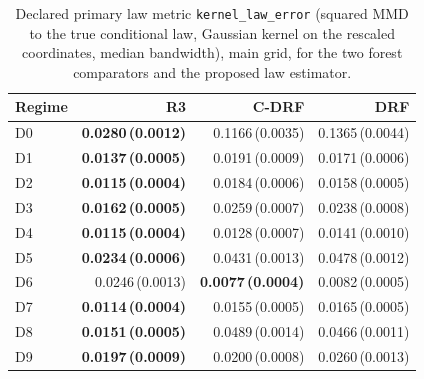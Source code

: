 \begin{table}[htbp]
\centering
\caption{Declared primary law metric \texttt{kernel\_law\_error} (squared MMD to the true conditional law, Gaussian kernel on the rescaled coordinates, median bandwidth), main grid, for the two forest comparators and the proposed law estimator.}
\label{tab:all-kernel}
\scriptsize
\setlength{\tabcolsep}{3.2pt}
\begin{tabular}{@{}lrrr@{}}
\toprule
Regime & R3 & C-DRF & DRF \\
\midrule
D0 & \textbf{0.0280\,(0.0012)} & 0.1166\,(0.0035) & 0.1365\,(0.0044) \\
D1 & \textbf{0.0137\,(0.0005)} & 0.0191\,(0.0009) & 0.0171\,(0.0006) \\
D2 & \textbf{0.0115\,(0.0004)} & 0.0184\,(0.0006) & 0.0158\,(0.0005) \\
D3 & \textbf{0.0162\,(0.0005)} & 0.0259\,(0.0007) & 0.0238\,(0.0008) \\
D4 & \textbf{0.0115\,(0.0004)} & 0.0128\,(0.0007) & 0.0141\,(0.0010) \\
D5 & \textbf{0.0234\,(0.0006)} & 0.0431\,(0.0013) & 0.0478\,(0.0012) \\
D6 & 0.0246\,(0.0013) & \textbf{0.0077\,(0.0004)} & 0.0082\,(0.0005) \\
D7 & \textbf{0.0114\,(0.0004)} & 0.0155\,(0.0005) & 0.0165\,(0.0005) \\
D8 & \textbf{0.0151\,(0.0005)} & 0.0489\,(0.0014) & 0.0466\,(0.0011) \\
D9 & \textbf{0.0197\,(0.0009)} & 0.0200\,(0.0008) & 0.0260\,(0.0013) \\
\bottomrule
\end{tabular}
\end{table}

